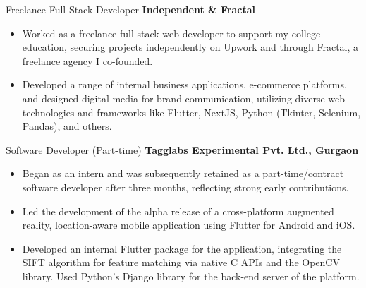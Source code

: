 {Freelance Full Stack Developer}
{\textbf{Independent \& Fractal}}
{
    \begin{itemize}
        \item Worked as a freelance full-stack web developer to support my
              college education, securing projects independently on
              \href{https://www.upwork.com/freelancers/~015388e15d840b96cb}{Upwork}
              and through \href{https://fractalweb.netlify.app/}{Fractal}, a freelance
              agency I co-founded.
        \item Developed a range of internal business
              applications, e-commerce platforms, and designed digital media for
              brand communication, utilizing diverse web technologies and
              frameworks like Flutter, NextJS, Python (Tkinter, Selenium,
              Pandas), and others.
    \end{itemize}
}
%
%
{Software Developer (Part-time)}
{\textbf{Tagglabs Experimental Pvt. Ltd., Gurgaon}}
{
    \begin{itemize}
        \item Began as an intern and was subsequently retained as a
              part-time/contract software developer after three months, reflecting
              strong early contributions.
        \item Led the development of the alpha release of a cross-platform
              augmented reality, location-aware mobile application using Flutter for
              Android and iOS.
        \item Developed an internal Flutter package for the application,
              integrating the SIFT algorithm for feature matching via native C APIs
              and the OpenCV library.  Used Python's Django library for the back-end
              server of the platform.
    \end{itemize}
}
%
%